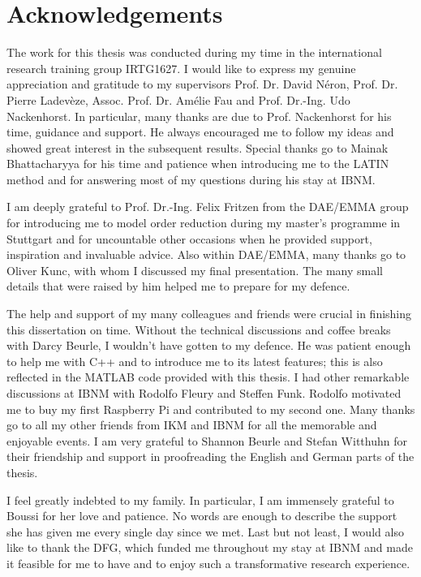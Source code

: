 \frontmatter
{}

\chapter*{Acknowledgements}
The work for this thesis was conducted during my time in the international research training group IRTG1627. I would like to express my genuine appreciation and gratitude to my supervisors Prof. Dr. David N\'{e}ron, Prof. Dr. Pierre Ladev\`{e}ze, Assoc. Prof. Dr. Am\'{e}lie Fau and Prof. Dr.-Ing. Udo Nackenhorst. In particular, many thanks are due to Prof. Nackenhorst for his time, guidance and support. He always encouraged me to follow my ideas and showed great interest in the subsequent results. Special thanks go to Mainak Bhattacharyya for his time and patience when introducing me to the LATIN method and for answering most of my questions during his stay at IBNM.

I am deeply grateful to Prof. Dr.-Ing. Felix Fritzen from the DAE/EMMA group for introducing me to model order reduction during my master's programme in Stuttgart and for uncountable other occasions when he provided support, inspiration and invaluable advice. Also within DAE/EMMA, many thanks go to Oliver Kunc, with whom I discussed my final presentation. The many small details that were raised by him helped me to prepare for my defence.

The help and support of my many colleagues and friends were crucial in finishing this dissertation on time. Without the technical discussions and coffee breaks with Darcy Beurle, I wouldn't have gotten to my defence. He was patient enough to help me with C++ and to introduce me to its latest features; this is also reflected in the MATLAB code provided with this thesis. I had other remarkable discussions at IBNM with Rodolfo Fleury and Steffen Funk. Rodolfo motivated me to buy my first Raspberry Pi and contributed to my second one. Many thanks go to all my other friends from IKM and IBNM for all the memorable and enjoyable events. I am very grateful to Shannon Beurle and Stefan Witthuhn for their friendship and support in proofreading the English and German parts of the thesis.

I feel greatly indebted to my family. In particular, I am immensely grateful to Boussi for her love and patience. No words are enough to describe the support she has given me every single day since we met. Last but not least, I would also like to thank the DFG, which funded me throughout my stay at IBNM and made it feasible for me to have and to enjoy such a transformative research experience.

